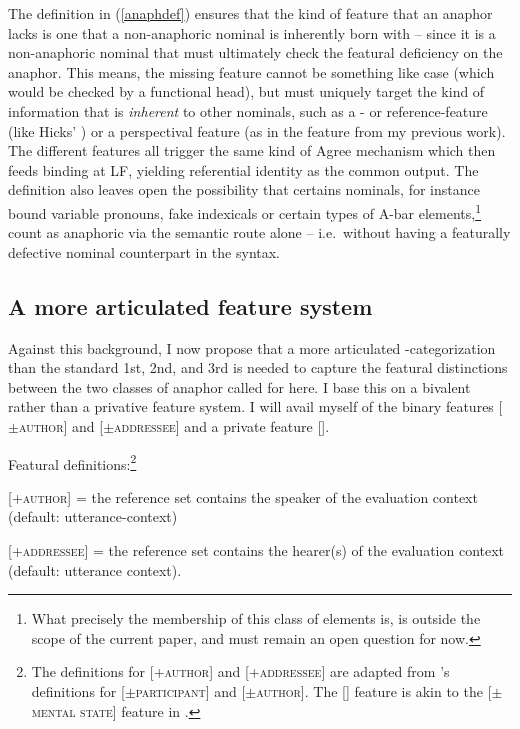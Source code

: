 \documentclass[output=paper, modfonts, nonflat]{langsci/langscibook}
\begin{document}
\noindent The definition in (\ref{anaphdef}) ensures that the kind of feature that an anaphor
lacks is one that a non-anaphoric nominal is inherently born with --
since it is a non-anaphoric nominal that must ultimately check the
featural deficiency on the anaphor. This means, the missing feature
cannot be something like case (which would be checked by a functional
head), but must uniquely target the kind of information that is
\emph{inherent} to other nominals, such as a \ph- or reference-feature
(like Hicks' \var) or a perspectival feature (as in the \dep{} feature
from my previous work). The different features all trigger the same
kind of Agree mechanism which then feeds binding at LF, yielding
referential identity as the common output. The definition also leaves
open the possibility that certains nominals, for instance bound
variable pronouns, fake indexicals \citep{kratzer:2009} or certain
types of A-bar elements,\footnote{What precisely the membership of
  this class of elements is, is outside the scope of the current
  paper, and must remain an open question for now.}  count as
anaphoric via the semantic route alone -- i.e.\ without having a
featurally defective nominal counterpart in the syntax.


\subsection{A more articulated feature system}

Against this background, I now propose that a more articulated
\person-cat\-e\-go\-rization than the standard 1st, 2nd, and 3rd is needed
to capture the featural distinctions between the two classes of
anaphor called for here. I base this on a bivalent rather than a
privative feature system. I will avail myself of the binary features
[$\pm$\textsc{author}] and [$\pm$\textsc{addressee}] and a private feature
[\sentience].

\ea\label{def} Featural definitions:\footnote{The definitions
  for [+\textsc{author}] and [+\textsc{addressee}] are adapted from
  \citet{halle:1997, nevins:2007}'s definitions for
  [$\pm$\textsc{participant}] and [$\pm$\textsc{author}]. The [\sentience] feature is
  akin to the [$\pm$\textsc{mental state}] feature in \citet{reinhart:2000}.}

\ea \textsc{[+author]} = the reference set contains the speaker of the
evaluation context (default: utterance-context)

\ex \textsc{[+addressee]} = the reference set contains the hearer(s)
of the evaluation context (default: utterance context).
\end{document}

